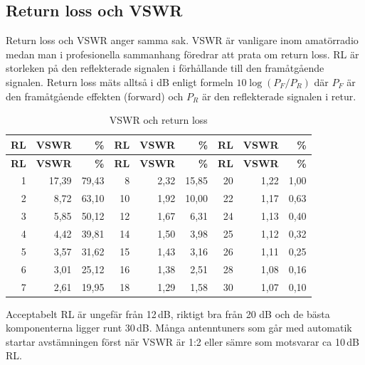 \subsection{Return loss och VSWR}

Return loss och VSWR anger samma sak. VSWR är vanligare inom amatörradio medan man i profesionella sammanhang föredrar att prata om return loss. RL är storleken på den reflekterade signalen i förhållande till den framåtgående signalen. Return loss mäts alltså i dB enligt formeln $10\log(P_F/P_R)$ där $P_F$ är den framåtgående effekten (forward) och  $P_R$ är den reflekterade signalen i retur.

\begin{longtable}{rrr|rrr|rrr}
	\caption{VSWR och return loss}\\
		\textbf{RL} & \textbf{VSWR} & \textbf{\%} & \textbf{RL} & \textbf{VSWR} & \textbf{\%} & \textbf{RL} & \textbf{VSWR} & \textbf{\%} \\ \hline 
	\endfirsthead
	\textbf{RL} & \textbf{VSWR} & \textbf{\%} & \textbf{RL} & \textbf{VSWR} & \textbf{\%} & \textbf{RL} & \textbf{VSWR} & \textbf{\%} \\ \hline 	\endhead
	          1 &         17,39 &       79,43 &           8 &          2,32 &       15,85 &          20 &          1,22 &        1,00 \\
	          2 &          8,72 &       63,10 &          10 &          1,92 &       10,00 &          22 &          1,17 &        0,63 \\
	          3 &          5,85 &       50,12 &          12 &          1,67 &        6,31 &          24 &          1,13 &        0,40 \\
	          4 &          4,42 &       39,81 &          14 &          1,50 &        3,98 &          25 &          1,12 &        0,32 \\
	          5 &          3,57 &       31,62 &          15 &          1,43 &        3,16 &          26 &          1,11 &        0,25 \\
	          6 &          3,01 &       25,12 &          16 &          1,38 &        2,51 &          28 &          1,08 &        0,16 \\
	          7 &          2,61 &       19,95 &          18 &          1,29 &        1,58 &          30 &          1,07 &        0,10
\end{longtable}

Acceptabelt RL är ungefär från 12\,dB, riktigt bra från 20 dB och de bästa komponenterna ligger runt 30\,dB. Många antenntuners som går med automatik startar avstämningen först när VSWR är 1:2 eller sämre som motsvarar ca 10\,dB\,RL.

